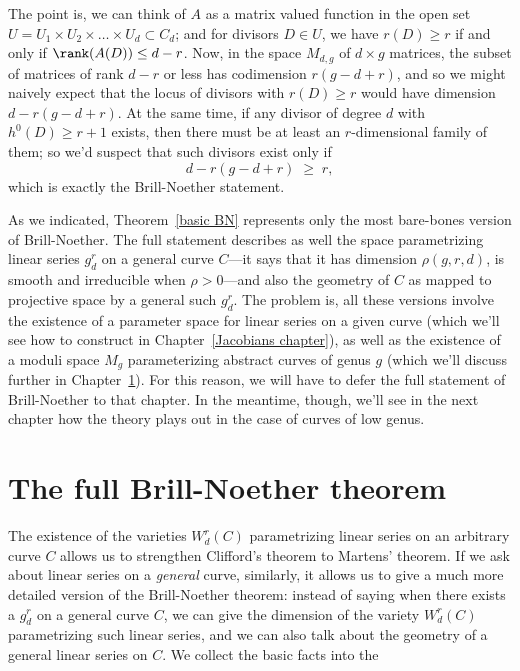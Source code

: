 The point is, we can think of $A$ as a matrix valued function in the open set $U = U_1 \times U_2 \times \dots \times U_d \subset C_d$; and for divisors $D \in U$, we have $r(D) \geq r$ if and only if $\rank(A(D)) \leq d-r$. Now, in the space $M_{d,g}$ of $d \times g$ matrices, the subset of matrices of rank $d-r$ or less has codimension $r(g-d+r)$, and so we might naively expect that the locus of divisors with $r(D) \geq r$ would have dimension $d - r(g-d+r)$. At the same time, if any divisor of degree $d$ with $h^0(D) \geq r+1$ exists, then there must be at least an $r$-dimensional family of them; so we'd suspect that such divisors exist only if
$$
d - r(g-d+r) \; \geq \; r,
$$
which is exactly the Brill-Noether statement.

As we indicated, Theorem~\ref{basic BN} represents only the most bare-bones version of Brill-Noether. The full statement describes as well the space parametrizing linear series $g^r_d$ on a general curve $C$---it says that it has dimension $\rho(g,r,d)$, is smooth and irreducible when $\rho > 0$---and also the geometry of $C$ as mapped to projective space by a general such $g^r_d$. The problem is, all these versions involve the existence of a parameter space for linear series on a given curve (which we'll see how to construct in Chapter~\ref{Jacobians chapter}), as well as the existence of a moduli space $M_g$ parameterizing abstract curves of genus $g$ (which we'll discuss further in Chapter~\ref{}). For this reason, we will have to defer the full statement of Brill-Noether to that chapter. In the meantime, though, we'll see in the next chapter how the theory plays out in the case of curves of low genus.

\section{The full Brill-Noether theorem}

The existence of the varieties $W^r_d(C)$ parametrizing linear series on an arbitrary curve $C$ allows us to strengthen Clifford's theorem to Martens' theorem. If we ask about linear series on a \emph{general} curve, similarly, it allows us to give a much more detailed version of the Brill-Noether theorem: instead of  saying when there exists a $g^r_d$ on a general curve $C$, we can give the dimension of the variety $W^r_d(C)$ parametrizing such linear series, and we can also talk about the geometry of a general linear series on $C$. We collect the basic facts into the 

